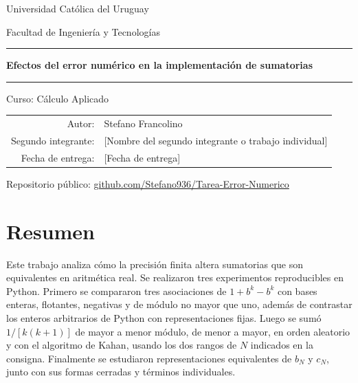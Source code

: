 \documentclass[11pt,a4paper]{article}
\begin{document}
\hypersetup{pageanchor=false}

\begin{titlepage}
  \centering
  \vspace*{1.4cm}
  {\large Universidad Católica del Uruguay\par}
  \vspace{0.25cm}
  {\large Facultad de Ingeniería y Tecnologías\par}
  \vspace{1.2cm}
  {\color{azulUCU}\rule{0.82\textwidth}{1.2pt}\par}
  \vspace{0.8cm}
  {\LARGE\bfseries Efectos del error numérico en la implementación de sumatorias\par}
  \vspace{0.8cm}
  {\color{azulUCU}\rule{0.82\textwidth}{1.2pt}\par}
  \vspace{1.4cm}
  {\large Curso: Cálculo Aplicado\par}
  \vspace{1.2cm}
  \begin{tabular}{rl}
    Autor: & Stefano Francolino \\
    Segundo integrante: & [Nombre del segundo integrante o trabajo individual] \\
    Fecha de entrega: & [Fecha de entrega]
  \end{tabular}
  \vfill
  {\small Repositorio público: \href{https://github.com/Stefano936/Tarea-Error-Numerico}{github.com/Stefano936/Tarea-Error-Numerico}\par}
  \vspace{0.8cm}
\end{titlepage}

\hypersetup{pageanchor=true}
\section*{Resumen}
Este trabajo analiza cómo la precisión finita altera sumatorias que son equivalentes en aritmética real. Se realizaron tres experimentos reproducibles en Python. Primero se compararon tres asociaciones de $1+b^k-b^k$ con bases enteras, flotantes, negativas y de módulo no mayor que uno, además de contrastar los enteros arbitrarios de Python con representaciones fijas. Luego se sumó $1/[k(k+1)]$ de mayor a menor módulo, de menor a mayor, en orden aleatorio y con el algoritmo de Kahan, usando los dos rangos de $N$ indicados en la consigna. Finalmente se estudiaron representaciones equivalentes de $b_N$ y $c_N$, junto con sus formas cerradas y términos individuales.
\end{document}
